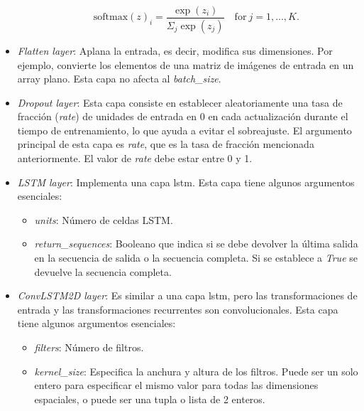 \begin{itemize}
\begin{itemize}
            \begin{equation}\label{eq:SoftMax}
		        \mathrm{softmax}(z)_i=\frac{\exp(z_i)}{\Sigma_{j}{\exp(z_j)}} \quad \mathrm{for} \ j=1, ...,K.
            \end{equation}
        \end{itemize}
    
    \item \textit{Flatten layer}: Aplana la entrada, es decir, modifica sus dimensiones. Por ejemplo, convierte los elementos de una matriz de imágenes de entrada en un array plano. Esta capa no afecta al \textit{batch\_size}.
    
    \item \textit{Dropout layer}: Esta capa consiste en establecer aleatoriamente una tasa de fracción (\textit{rate}) de unidades de entrada en 0 en cada actualización durante el tiempo de entrenamiento, lo que ayuda a evitar el sobreajuste. El argumento principal de esta capa es \textit{rate}, que es la tasa de fracción mencionada anteriormente. El valor de \textit{rate} debe estar entre 0 y 1.

    
    \item \textit{LSTM layer}: Implementa una capa \acrfull{lstm}. Esta capa tiene algunos argumentos esenciales:
    
        \begin{itemize}
            \item \textit{units}: Número de celdas LSTM.
            
            \item \textit{return\_sequences}: Booleano que indica si se debe devolver la última salida en la secuencia de salida o la secuencia completa. Si se establece a \textit{True} se devuelve la secuencia completa.
        \end{itemize}
        
     \item \textit{ConvLSTM2D layer}: Es similar a una capa \acrfull{lstm}, pero las transformaciones de entrada y las transformaciones recurrentes son convolucionales. Esta capa tiene algunos argumentos esenciales:
    
        \begin{itemize}
             \item \textit{filters}: Número de filtros. 
            
            \item \textit{kernel\_size}: Especifica la anchura y altura de los filtros. Puede ser un solo entero para especificar el mismo valor para todas las dimensiones espaciales, o puede ser una tupla o lista de 2 enteros.
            

\end{itemize}
\end{itemize}
